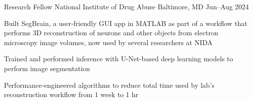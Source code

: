 \experience
{Research Fellow}
{National Institute of Drug Abuse}
{Baltimore, MD}
{Jun--Aug 2024}
{
	\item Built SegBrain, a user-friendly GUI app in MATLAB as part of a workflow that performs 3D reconstruction of neurons and other objects from electron microscopy image volumes, now used by several researchers at NIDA
	\item Trained and performed inference with U-Net-based deep learning models to perform image segmentation
	\item Performance-engineered algorithms to reduce total time used by lab's reconstruction workflow from 1 week to 1 hr
}
